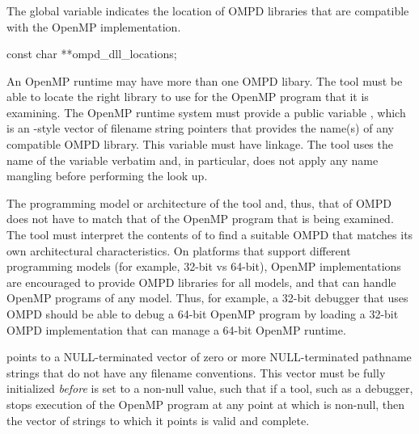 \subsubsection{}
\label{subsubsec:ompd_dll_locations}

\summary
The  global variable indicates the location
of OMPD libraries that are compatible with the OpenMP implementation.

\format
\begin{cspecific}
\begin{ompSyntax}
const char **ompd_dll_locations;
\end{ompSyntax}
\end{cspecific}

\descr
An OpenMP runtime may have more than one OMPD libary. The tool must be able 
to locate the right library to use for the OpenMP program that it is examining.
The OpenMP runtime system must provide a public variable ,
which is an -style vector of filename string pointers that provides 
the name(s) of any compatible OMPD library. This variable must have  
linkage. The tool uses the name of the variable verbatim and, in particular, 
does not apply any name mangling before performing the look up.

The programming model or architecture of the tool and, thus, that of OMPD does 
not have to match that of the OpenMP program that is being examined. The tool
must interpret the contents of  to find a suitable OMPD 
that matches its own architectural characteristics. On platforms that support 
different programming models (for example, 32-bit vs 64-bit), OpenMP 
implementations are encouraged to provide OMPD libraries for all models, and 
that can handle OpenMP programs of any model. Thus, for example, a 32-bit 
debugger that uses OMPD should be able to debug a 64-bit OpenMP program by 
loading a 32-bit OMPD implementation that can manage a 64-bit OpenMP runtime.

 points to a NULL-terminated vector of zero or more 
NULL-terminated pathname strings that do not have any filename conventions. 
This vector must be fully initialized \emph{before}  
is set to a non-null value, such that if a tool, such as a debugger, stops 
execution of the OpenMP program at any point at which  
is non-null, then the vector of strings to which it points is valid and complete.

